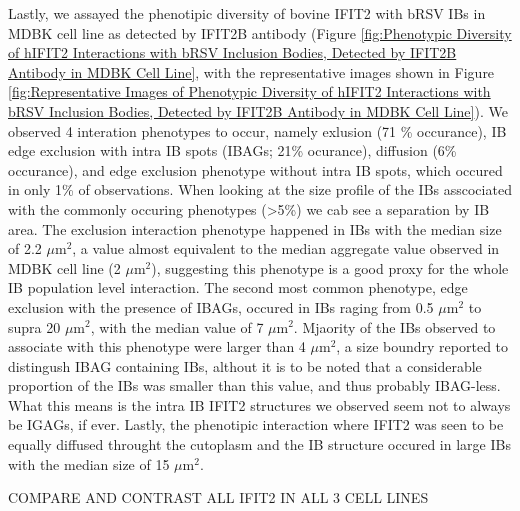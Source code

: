 Lastly, we assayed the phenotipic diversity of bovine IFIT2 with bRSV IBs in MDBK cell line as detected by IFIT2B antibody (Figure \ref{fig:Phenotypic Diversity of hIFIT2 Interactions with bRSV Inclusion Bodies, Detected by IFIT2B Antibody in MDBK Cell Line}, with the representative images shown in Figure \ref{fig:Representative Images of Phenotypic Diversity of hIFIT2 Interactions with bRSV Inclusion Bodies, Detected by IFIT2B Antibody in MDBK Cell Line}). We observed 4 interation phenotypes to occur, namely exlusion (71 \% occurance), IB edge exclusion with intra IB spots (IBAGs; 21\% ocurance), diffusion (6\% occurance), and edge exclusion phenotype without intra IB spots, which occured in only 1\% of observations. When looking at the size profile of the IBs asscociated with the commonly occuring phenotypes (>5\%) we cab see a separation by IB area. The exclusion interaction phenotype happened in IBs with the median size of 2.2 \(\mu \mbox{m}^2\), a value almost equivalent to the median aggregate value observed in MDBK cell line (2 \(\mu \mbox{m}^2\)), suggesting this phenotype is a good proxy for the whole IB population level interaction. The second most common phenotype, edge exclusion with the presence of IBAGs, occured in IBs raging from 0.5 \(\mu \mbox{m}^2\) to supra 20 \(\mu \mbox{m}^2\), with the median value of 7 \(\mu \mbox{m}^2\). Mjaority of the IBs observed to associate with this phenotype were larger than 4 \(\mu \mbox{m}^2\), a size boundry reported to distingush IBAG containing IBs, althout it is to be noted that a considerable proportion of the IBs was smaller than this value, and thus probably IBAG-less. What this means is the intra IB IFIT2 structures we observed seem not to always be IGAGs, if ever. Lastly, the phenotipic interaction where IFIT2 was seen to be equally diffused throught the cutoplasm and the IB structure occured in large IBs with the median size of 15 \(\mu \mbox{m}^2\).

COMPARE AND CONTRAST ALL IFIT2 IN ALL 3 CELL LINES

